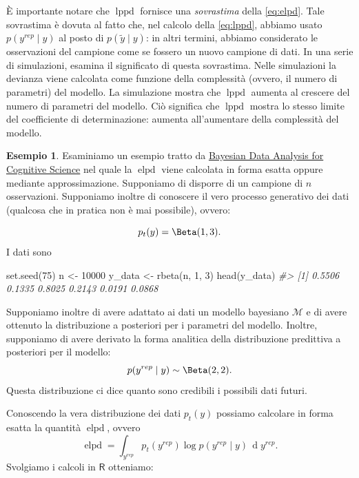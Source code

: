 \documentclass[
  10pt,
  italian,
  a4paper,
  extrafontsizes,onecolumn,openright
  ]{memoir}
\newenvironment{Shaded}{\begin{snugshade}}{\end{snugshade}}
\newcommand{\CommentTok}[1]{\textcolor[rgb]{0.56,0.35,0.01}{\textit{#1}}}
\newcommand{\DecValTok}[1]{\textcolor[rgb]{0.00,0.00,0.81}{#1}}
\newcommand{\FunctionTok}[1]{\textcolor[rgb]{0.00,0.00,0.00}{#1}}
\newcommand{\NormalTok}[1]{#1}
\newcommand{\OtherTok}[1]{\textcolor[rgb]{0.56,0.35,0.01}{#1}}
\DeclareMathOperator{\elpd}{elpd} %
\DeclareMathOperator{\lppd}{lppd} %
\newcommand{\R}{\textsf{R}} %
\theoremstyle{definition}
\theoremstyle{definition}
\newtheorem{example}{Esempio}[chapter]
\theoremstyle{definition}
\theoremstyle{definition}
\theoremstyle{remark}
\begin{document}
È importante notare che \(\lppd\) fornisce una \emph{sovrastima} della \eqref{eq:elpd}. Tale sovrastima è dovuta al fatto che, nel calcolo della \eqref{eq:lppd}, abbiamo usato \(p(y^{rep} \mid y)\) al posto di \(p(\tilde{y} \mid y)\): in altri termini, abbiamo considerato le osservazioni del campione come se fossero un nuovo campione di dati. In una serie di simulazioni, \textcite{McElreath_rethinking} esamina il significato di questa sovrastima. Nelle simulazioni la devianza viene calcolata come funzione della complessità (ovvero, il numero di parametri) del modello. La simulazione mostra che \(\lppd\) aumenta al crescere del numero di parametri del modello. Ciò significa che \(\lppd\) mostra lo stesso limite del coefficiente di determinazione: aumenta all'aumentare della complessità del modello.

\begin{example}
Esaminiamo un esempio tratto da \href{https://vasishth.github.io/bayescogsci/book/expected-log-predictive-density-of-a-model.html}{Bayesian Data Analysis for Cognitive Science} nel quale la \(\elpd\) viene calcolata in forma esatta oppure mediante approssimazione. Supponiamo di disporre di un campione di \(n\) osservazioni. Supponiamo inoltre di conoscere il vero processo generativo dei dati (qualcosa che in pratica non è mai possibile), ovvero:

\[
p_t(y) = \Beta(1, 3).
\]
I dati sono

\begin{Shaded}
\begin{Highlighting}[]
\FunctionTok{set.seed}\NormalTok{(}\DecValTok{75}\NormalTok{)}
\NormalTok{n }\OtherTok{\textless{}{-}} \DecValTok{10000}
\NormalTok{y\_data }\OtherTok{\textless{}{-}} \FunctionTok{rbeta}\NormalTok{(n, }\DecValTok{1}\NormalTok{, }\DecValTok{3}\NormalTok{)}
\FunctionTok{head}\NormalTok{(y\_data)}
\CommentTok{\#\textgreater{} [1] 0.5506 0.1335 0.8025 0.2143 0.0191 0.0868}
\end{Highlighting}
\end{Shaded}

\noindent
Supponiamo inoltre di avere adattato ai dati un modello bayesiano \(\mathcal{M}\) e di avere ottenuto la distribuzione a posteriori per i parametri del modello. Inoltre, supponiamo di avere derivato la forma analitica della distribuzione predittiva a posteriori per il modello:
\[
p(y^{rep} \mid y) \sim \Beta(2, 2).
\]
Questa distribuzione ci dice quanto sono credibili i possibili dati futuri.

Conoscendo la vera distribuzione dei dati \(p_t(y)\) possiamo calcolare in forma esatta la quantità \(\elpd\), ovvero
\[
\elpd = \int_{y^{rep}}p_{t}(y^{rep})\log p(y^{rep} \mid y) \,\operatorname {d}\!y^{rep}.
\]
\noindent
Svolgiamo i calcoli in \(\R\) otteniamo:


\end{example}
\end{document}
